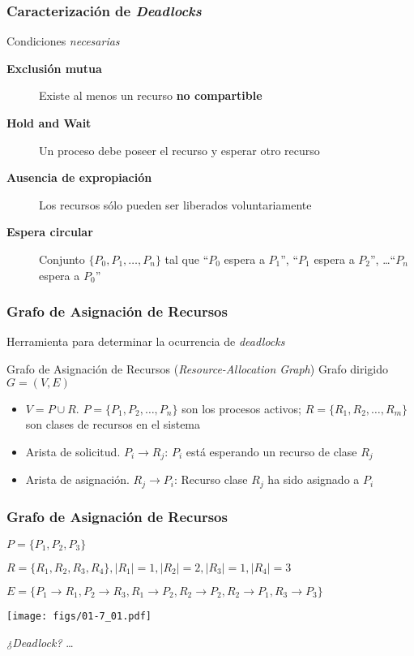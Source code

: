 \documentclass[letter]{beamer}
\begin{document}
\begin{frame}
  \frametitle{Caracterización de {\em Deadlocks}}

  Condiciones {\em necesarias}
  
  \begin{description}
    \item[{\bf Exclusión mutua}] Existe al menos un recurso {\bf no compartible}
    \item[{\bf Hold and Wait}] Un proceso debe poseer el recurso y esperar otro recurso
    \item[{\bf Ausencia de expropiación}] Los recursos sólo pueden ser liberados voluntariamente
    \item[{\bf Espera circular}] Conjunto $\{P_0, P_1,\ldots,P_n\}$ tal que ``$P_0$ espera a $P_1$'',
                                 ``$P_1$ espera a $P_2$'', \ldots ``$P_n$ espera a $P_0$''
  \end{description}

\end{frame}

\begin{frame}
  \frametitle{Grafo de Asignación de Recursos}

  Herramienta para determinar la ocurrencia de {\em deadlocks}
  \begin{block}{Grafo de Asignación de Recursos ({\em Resource-Allocation Graph})}
    Grafo dirigido $G=(V,E)$
    \begin{itemize}
      \item $V = P \cup R$. $P=\{P_1, P_2, \ldots, P_n\}$ son los procesos activos;
                            $R=\{R_1, R_2, \ldots, R_m\}$ son clases de recursos en el sistema
      \item Arista de solicitud. $P_i \to R_j$: $P_i$ está esperando un recurso de clase $R_j$
      \item Arista de asignación. $R_j \to P_i$: Recurso clase $R_j$ ha sido asignado a $P_i$
    \end{itemize}
  \end{block}

\end{frame}

\begin{frame}
  \frametitle{Grafo de Asignación de Recursos}

  $P=\{P_1,P_2,P_3\}$
  
  $R=\{R_1,R_2,R_3,R_4\}, |R_1|=1, |R_2|=2, |R_3|=1, |R_4|=3$
  
  $E=\{P_1 \to R_1, P_2 \to R_3, R_1 \to P_2, R_2 \to P_2, R_2 \to P_1, R_3 \to P_3\}$

  \begin{center}
    \texttt{[image: figs/01-7\_01.pdf]}
  \end{center}

  {\em ¿Deadlock?} \ldots {}

\end{frame}
\end{document}
